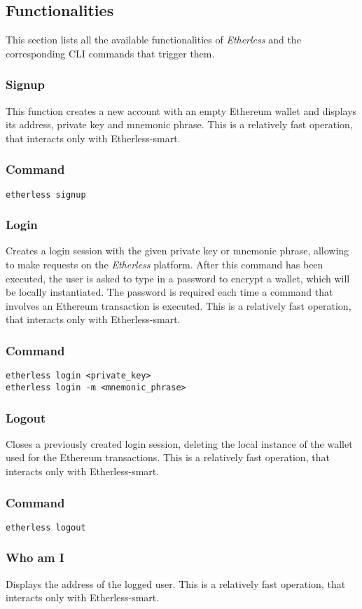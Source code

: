 \subsection{Functionalities}
	This section lists all the available functionalities of \textit{Etherless} and the corresponding CLI commands that trigger them.
	\subsubsection{Signup}
	This function creates a new account with an empty Ethereum wallet and displays its address, private key and mnemonic phrase. This is a relatively fast operation, that interacts only with Etherless-smart.
	\subsubsection*{Command}
	\texttt{etherless signup}
	\subsubsection{Login}
	Creates a login session with the given private key or mnemonic phrase, allowing to make requests on the \textit{Etherless} platform. After this command has been executed, the user is asked to type in a password to encrypt a wallet, which will be locally instantiated. The password is required each time a command that involves an Ethereum transaction is executed. This is a relatively fast operation, that interacts only with Etherless-smart.
	\subsubsection*{Command}
	\texttt{etherless login <private\_key>} \\
	\texttt{etherless login -m <mnemonic\_phrase>}
	\subsubsection{Logout}
	Closes a previously created login session, deleting the local instance of the wallet used for the Ethereum transactions. This is a relatively fast operation, that interacts only with Etherless-smart.
	\subsubsection*{Command}
	\texttt{etherless logout}
	\subsubsection{Who am I}
	Displays the address of the logged user. This is a relatively fast operation, that interacts only with Etherless-smart.
